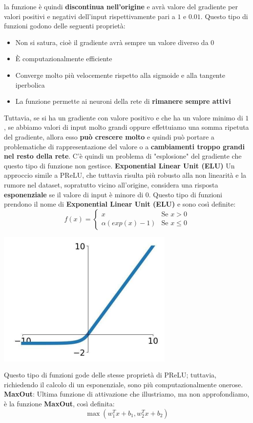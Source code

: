 \documentclass[12pt]{article}
\begin{document}
la funzione è quindi \textbf{discontinua nell'origine} e avrà valore del gradiente per valori positivi e negativi dell'input rispettivamente pari a $1$ e $0.01$.
Questo tipo di funzioni godono delle seguenti proprietà:
\begin{itemize}
    \item Non si satura, cioè il gradiente avrà sempre un valore diverso da 0
    \item È computazionalmente efficiente
    \item Converge molto più velocemente rispetto alla sigmoide e alla tangente iperbolica
    \item La funzione permette ai neuroni della rete di \textbf{rimanere sempre attivi}
\end{itemize}
Tuttavia, se si ha un gradiente con valore positivo e che ha un valore minimo di $1$, se abbiamo valori di input molto grandi oppure effettuiamo una somma ripetuta del gradiente, allora esso \textbf{può crescere molto} e quindi può portare
a problematiche di rappresentazione del valore o a \textbf{cambiamenti troppo grandi nel resto della rete}. C'è quindi un problema di "esplosione" del gradiente che questo tipo di funzione non gestisce. \newline
\textbf{Exponential Linear Unit (ELU)} \newline
Un approccio simile a PReLU, che tuttavia risulta più robusto alla non linearità e la rumore nel dataset, sopratutto vicino all'origine, considera una risposta \textbf{esponenziale} se il valore di input è minore di 0.
Questo tipo di funzioni prendono il nome di \textbf{Exponential Linear Unit (ELU)} e sono così definite:
\begin{equation*}
    f(x) = \begin{cases}
        x & \textrm{Se } x > 0 \\
        \alpha (exp(x) - 1) & \textrm{Se } x \leq 0
    \end{cases}
\end{equation*}
\begin{center}
    \includegraphics[width =0.40\linewidth]{Images/138.PNG}
\end{center}
Questo tipo di funzioni gode delle stesse proprietà di PReLU; tuttavia, richiedendo il calcolo di un esponenziale, sono più computazionalmente onerose. \newline
\textbf{MaxOut}: \newline
Ultima funzione di attivazione che illustriamo, ma non approfondiamo, è la funzione \textbf{MaxOut}, così definita:
$$\max(w_1^T x + b_1, w_2^T x + b_2)$$
\end{document}
